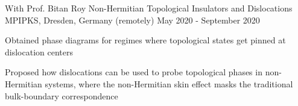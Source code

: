 \begin{cventries}
\cventry
{With Prof. Bitan Roy} %
{Non-Hermitian Topological Insulators and Dislocations} %
{MPIPKS, Dresden, Germany (remotely)} %
{May 2020 - September 2020} %
{
	\begin{cvitems} %
		\item {Obtained phase diagrams for regimes where topological states get pinned at dislocation centers}
		\item {Proposed how dislocations can be used to probe topological phases in non-Hermitian systems, where the non-Hermitian skin effect masks the traditional bulk-boundary correspondence}
	\end{cvitems}
}



\end{cventries}
